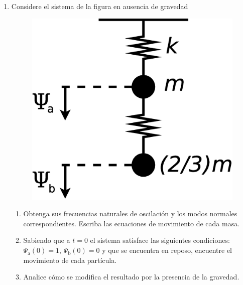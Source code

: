 \documentclass[11pt,spanish]{article}
\begin{document}
\begin{enumerate}

    \section*{Sistemas con más de un grado de libertad}


    \item Considere el sistema de la figura en ausencia de gravedad

    \begin{figure}[H]
        \centering{}\includegraphics[clip,scale=0.25]{figs/ej1-6}
    \end{figure}

    \begin{enumerate}
        \item Obtenga sus frecuencias naturales de oscilación y los modos
        normales correspondientes. Escriba las ecuaciones de movimiento de cada
        masa.

        \item Sabiendo que a $t=0$ el sistema satisface las siguientes
        condiciones: $\Psi_\text{a}(0)=1,\,\Psi_\text{b}(0)=0$ y que se
        encuentra en reposo, encuentre el movimiento de cada partícula.

        \item Analice cómo se modifica el resultado por la presencia de la
        gravedad.
    \end{enumerate}



\end{enumerate}
\end{document}
